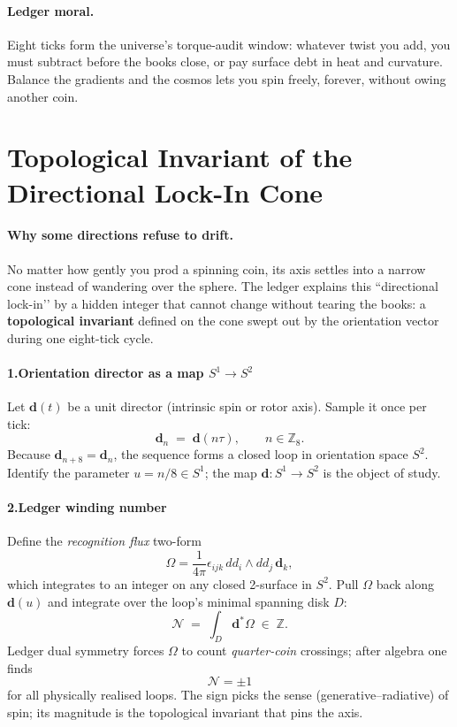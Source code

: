 \documentclass[11pt,oneside]{book}
\begin{document}
\paragraph*{Ledger moral.}
Eight ticks form the universe’s torque-audit window: whatever twist you
add, you must subtract before the books close, or pay surface debt in
heat and curvature.  Balance the gradients and the cosmos lets you spin
freely, forever, without owing another coin.

\section{Topological Invariant of the Directional Lock-In Cone}
\label{sec:lock-in-invariant}

\paragraph*{Why some directions refuse to drift.}
No matter how gently you prod a spinning coin, its axis settles into a narrow cone instead of wandering over the sphere.  
The ledger explains this “directional lock-in’’ by a hidden integer that
cannot change without tearing the books: a \textbf{topological
invariant} defined on the cone swept out by the orientation vector
during one eight-tick cycle.

\paragraph*{1.\;Orientation director as a map \(S^{1}\to S^{2}\)}

Let $\mathbf d(t)$ be a unit director (intrinsic spin or rotor axis).  
Sample it once per tick:  
\[
  \mathbf d_{n}\;=\;\mathbf d(n\tau),\qquad n\in\mathbb Z_{8}.
\]
Because $\mathbf d_{n+8}=\mathbf d_{n}$, the sequence forms a closed
loop in orientation space $S^{2}$.  
Identify the parameter \(u = n/8 \in S^{1}\); the map
\(\mathbf d : S^{1}\!\to S^{2}\) is the object of study.

\paragraph*{2.\;Ledger winding number}

Define the \emph{recognition flux} two-form
\[
  \Omega
  = \frac{1}{4\pi}
    \epsilon_{ijk}\,
    d\!d_{i}\wedge d\!d_{j}\,\mathbf d_{k},
\]
which integrates to an integer on any closed 2-surface in $S^{2}$.  
Pull $\Omega$ back along $\mathbf d(u)$ and integrate over the loop’s
minimal spanning disk $D$:
\[
  \mathcal N
  \;=\;
  \int_{D} \mathbf d^{*}\Omega
  \;\in\;\mathbb Z.
\]
Ledger dual symmetry forces $\Omega$ to count \emph{quarter-coin}
crossings; after algebra one finds
\[
  \boxed{\;\mathcal N = \pm1\;}
\]
for all physically realised loops.  The sign picks the sense
(generative–radiative) of spin; its magnitude is the topological
invariant that pins the axis.
\end{document}
